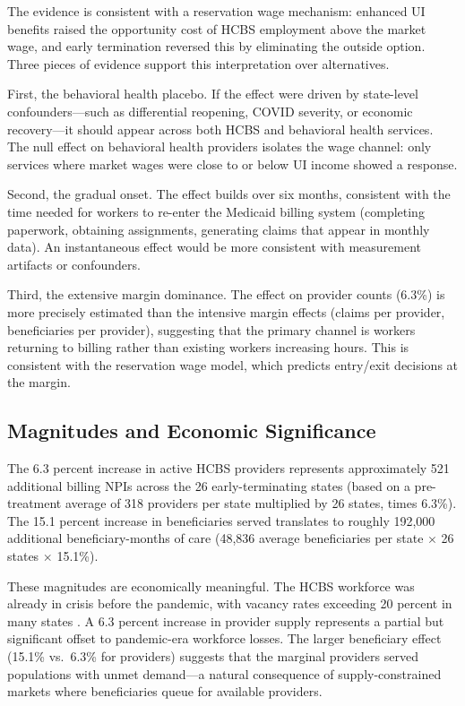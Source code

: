 \documentclass[12pt]{article}
\begin{document}
The evidence is consistent with a reservation wage mechanism: enhanced UI benefits raised the opportunity cost of HCBS employment above the market wage, and early termination reversed this by eliminating the outside option. Three pieces of evidence support this interpretation over alternatives.

First, the behavioral health placebo. If the effect were driven by state-level confounders---such as differential reopening, COVID severity, or economic recovery---it should appear across both HCBS and behavioral health services. The null effect on behavioral health providers isolates the wage channel: only services where market wages were close to or below UI income showed a response.

Second, the gradual onset. The effect builds over six months, consistent with the time needed for workers to re-enter the Medicaid billing system (completing paperwork, obtaining assignments, generating claims that appear in monthly data). An instantaneous effect would be more consistent with measurement artifacts or confounders.

Third, the extensive margin dominance. The effect on provider counts (6.3\%) is more precisely estimated than the intensive margin effects (claims per provider, beneficiaries per provider), suggesting that the primary channel is workers returning to billing rather than existing workers increasing hours. This is consistent with the reservation wage model, which predicts entry/exit decisions at the margin.

\subsection{Magnitudes and Economic Significance}

The 6.3 percent increase in active HCBS providers represents approximately 521 additional billing NPIs across the 26 early-terminating states (based on a pre-treatment average of 318 providers per state multiplied by 26 states, times 6.3\%). The 15.1 percent increase in beneficiaries served translates to roughly 192,000 additional beneficiary-months of care (48,836 average beneficiaries per state $\times$ 26 states $\times$ 15.1\%).

These magnitudes are economically meaningful. The HCBS workforce was already in crisis before the pandemic, with vacancy rates exceeding 20 percent in many states \citep{phi2021}. A 6.3 percent increase in provider supply represents a partial but significant offset to pandemic-era workforce losses. The larger beneficiary effect (15.1\% vs.\ 6.3\% for providers) suggests that the marginal providers served populations with unmet demand---a natural consequence of supply-constrained markets where beneficiaries queue for available providers.
\end{document}

